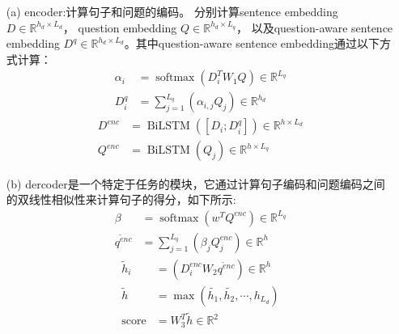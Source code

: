 \documentclass[a4paper,UTF8]{article}
\numberwithin{equation}{section}
\begin{document}
\begin{enumerate}
	\item[(a)] encoder:计算句子和问题的编码。
		\subitem[1] 分别计算sentence embedding $D \in \mathbb{R}^{h_{d} \times L_{d}}$，
		question embedding $Q \in \mathbb{R}^{h_{d} \times L_{q}}$，
		以及question-aware sentence embedding $D^q \in \mathbb{R}^{h_{d} \times L_{d}}$。其中question-aware sentence embedding通过以下方式计算：
		$$
\begin{aligned} \alpha_{i} &=\operatorname{softmax}\left(D_{i}^{T} W_{1} Q\right) \in \mathbb{R}^{L_{q}} \\ D_{i}^{q} &=\sum_{j=1}^{L_{q}}\left(\alpha_{i, j} Q_{j}\right) \in \mathbb{R}^{h_{d}} \end{aligned}
$$		
		\subitem[2] $$
	\begin{aligned} D^{e n c} &=\operatorname{BiLSTM}\left(\left[D_{i} ; D_{i}^{q}\right]\right) \in \mathbb{R}^{h \times L_{d}} \\ Q^{e n c} &=\operatorname{BiLSTM}\left(Q_{j}\right) \in \mathbb{R}^{h \times L_{q}} \end{aligned}
	$$
	\item[(b)] dercoder是一个特定于任务的模块，它通过计算句子编码和问题编码之间的双线性相似性来计算句子的得分，如下所示:
		\subitem[1] 
		$$
\begin{aligned} \beta &=\operatorname{softmax}\left(w^{T} Q^{e n c}\right) \in \mathbb{R}^{L_{q}} \\ q^{\tilde{e} n c} &=\sum_{j=1}^{L_{q}}\left(\beta_{j} Q_{j}^{e n c}\right) \in \mathbb{R}^{h} \end{aligned}
$$
$$
\begin{aligned} \tilde{h}_{i} &=\left(D_{i}^{e n c} W_{2} q^{\tilde{e} n c}\right) \in \mathbb{R}^{h} \\ \tilde{h} &=\max \left(\tilde{h_{1}}, \tilde{h_{2}}, \cdots, h_{L_{d}}\right) \\ \text {score} &=W_{3}^{T} \tilde{h} \in \mathbb{R}^{2} \end{aligned}
$$
\end{enumerate}

\newpage
\end{document}
